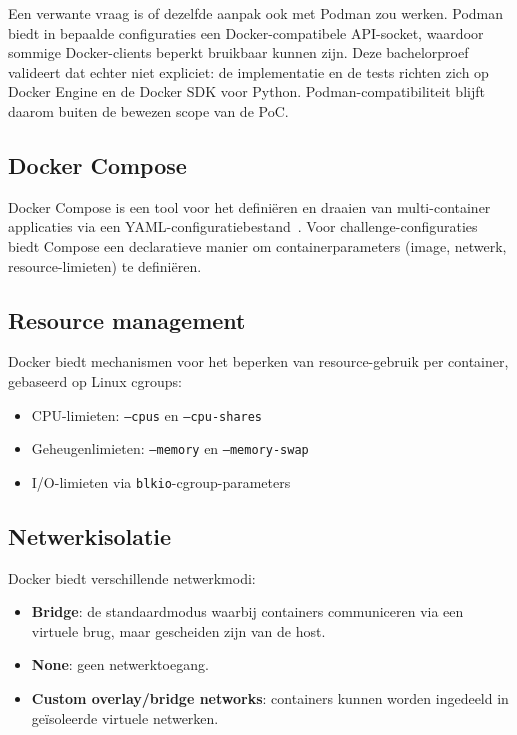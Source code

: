 Een verwante vraag is of dezelfde aanpak ook met Podman zou werken. Podman biedt in bepaalde configuraties een Docker-compatibele API-socket, waardoor sommige Docker-clients beperkt bruikbaar kunnen zijn. Deze bachelorproef valideert dat echter niet expliciet: de implementatie en de tests richten zich op Docker Engine en de Docker SDK voor Python. Podman-compatibiliteit blijft daarom buiten de bewezen scope van de PoC.

\subsection{Docker Compose}

Docker Compose is een tool voor het definiëren en draaien van multi-container applicaties via een YAML-configuratiebestand~\autocite{DockerCompose}. Voor challenge-configuraties biedt Compose een declaratieve manier om containerparameters (image, netwerk, resource-limieten) te definiëren.

\subsection{Resource management}

Docker biedt mechanismen voor het beperken van resource-gebruik per container, gebaseerd op Linux cgroups:

\begin{itemize}
  \item CPU-limieten: \texttt{--cpus} en \texttt{--cpu-shares}
  \item Geheugenlimieten: \texttt{--memory} en \texttt{--memory-swap}
  \item I/O-limieten via \texttt{blkio}-cgroup-parameters
\end{itemize}

\subsection{Netwerkisolatie}

Docker biedt verschillende netwerkmodi:

\begin{itemize}
  \item \textbf{Bridge}: de standaardmodus waarbij containers communiceren via een virtuele brug, maar gescheiden zijn van de host.
  \item \textbf{None}: geen netwerktoegang.
  \item \textbf{Custom overlay/bridge networks}: containers kunnen worden ingedeeld in geïsoleerde virtuele netwerken.
\end{itemize}

